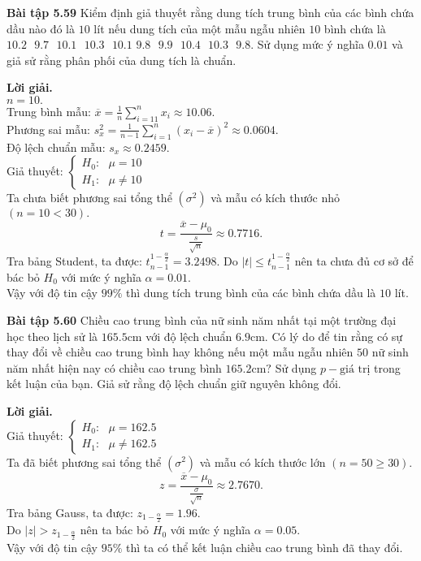 \begin{mybox}
\textbf{Bài tập 5.59} Kiểm định giả thuyết rằng dung tích trung bình của các bình chứa dầu nào đó là $10$ lít nếu dung tích của một mẫu ngẫu nhiên $10$ bình chứa là $10.2 \text{ } 9.7 \text{ } 10.1 \text{ } 10.3 \text{ } 10.1$ $9.8 \text{ } 9.9 \text{ } 10.4 \text{ } 10.3 \text{ } 9.8.$ Sử dụng mức ý nghĩa $0.01$ và giả sử rằng phân phối của dung tích là chuẩn.
\end{mybox}
\textbf{Lời giải.}\\
$n = 10.$\\
Trung bình mẫu:
$\overline x  = \frac{1}{n}\sum\limits_{i =1 1}^n {{x_i}}  \approx 10.06.$\\
Phương sai mẫu: $s_x^2 = \frac{1}{{n - 1}}\sum\limits_{i = 1}^n {{{\left( {{x_i} - \overline x } \right)}^2}}  \approx 0.0604.$\\
Độ lệch chuẩn mẫu: ${s_x} \approx 0.2459.$\\
Giả thuyết: $\begin{cases}
H_0: \text{ } \mu = 10\\
H_1: \text{ } \mu \ne 10
\end{cases} $ \\
Ta chưa biết phương sai tổng thể $\left( {\sigma^2} \right)$ và mẫu có kích thước nhỏ $\left( {n = 10 < 30} \right).$
$$t = \frac{\overline{x} - \mu_0}{\frac{s}{\sqrt{n}}} \approx 0.7716.$$
Tra bảng Student, ta được: $t_{n - 1}^{1 - \frac{\alpha}{2}} = 3.2498.$
Do $\left| t \right| \leqslant t_{n - 1}^{1 - \frac{\alpha}{2}}$ nên ta chưa đủ cơ sở để bác bỏ $H_0$ với mức ý nghĩa $\alpha = 0.01.$\\
Vậy với độ tin cậy $99\%$ thì dung tích trung bình của các bình chứa dầu là $10$ lít.

\begin{mybox}
\textbf{Bài tập 5.60} Chiều cao trung bình của nữ sinh năm nhất tại một trường đại học theo lịch sử là $165.5 \mathrm{cm}$ với độ lệch chuẩn $6.9\mathrm{cm}.$ Có lý do để tin rằng có sự thay đổi về chiều cao trung bình hay không nếu một mẫu ngẫu nhiên $50$ nữ sinh năm nhất hiện nay có chiều cao trung bình $165.2 \mathrm{cm}?$ Sử dụng $p-\text{giá trị}$ trong kết luận của bạn. Giả sử rằng độ lệch chuẩn giữ nguyên không đổi.
\end{mybox}
\textbf{Lời giải.}\\
Giả thuyết: $\begin{cases}
H_0: \text{ } \mu = 162.5\\
H_1: \text{ } \mu \ne 162.5
\end{cases} $ \\
Ta đã biết phương sai tổng thể $\left( {\sigma^2} \right)$ và mẫu có kích thước lớn $\left( {n = 50 \geqslant 30} \right).$
$$z = \frac{\overline{x} - \mu_0}{\frac{\sigma}{\sqrt{n}}} \approx 2.7670.$$
Tra bảng Gauss, ta được: $z_{1 - \frac{\alpha}{2}} = 1.96.$\\
Do $\left| z \right| > z_{1 - \frac{\alpha}{2}}$ nên ta bác bỏ $H_0$ với mức ý nghĩa $\alpha = 0.05.$\\
Vậy với độ tin cậy $95\%$ thì ta có thể kết luận chiều cao trung bình đã thay đổi.

